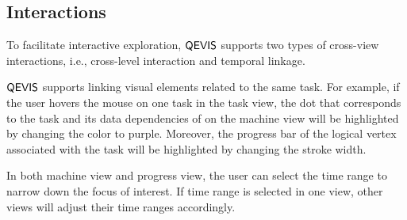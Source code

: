 \subsection{Interactions}
%
%


To facilitate interactive exploration, $\mathsf{QEVIS}$ supports two types of cross-view interactions, i.e., cross-level interaction and temporal linkage.

$\mathsf{QEVIS}$ supports linking visual elements related to the same task. 
For example, if the user hovers the mouse on one task in the task view, the dot that corresponds to the task and its data dependencies of on the machine view will be highlighted by changing the color to purple. Moreover, the progress bar of the logical vertex associated with the task will be highlighted by changing the stroke width.   

In both machine view and progress view, the user can select the time range to narrow down the focus of interest. If time range is selected in one view, other views will adjust their time ranges accordingly.

